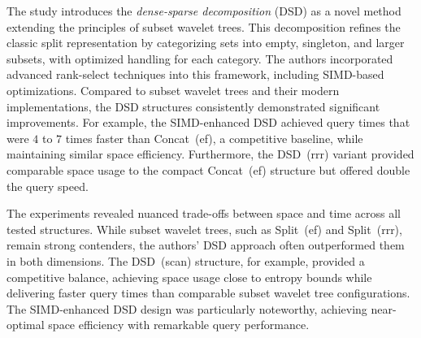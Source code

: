\noindent The study introduces the \emph{dense-sparse decomposition} (DSD) as a novel method extending the principles of subset wavelet trees. This decomposition refines the classic split representation by categorizing sets into empty, singleton, and larger subsets, with optimized handling for each category. The authors incorporated advanced rank-select techniques into this framework, including SIMD-based optimizations. Compared to subset wavelet trees and their modern implementations, the DSD structures consistently demonstrated significant improvements. For example, the SIMD-enhanced DSD achieved query times that were $4$ to $7$ times faster than Concat~(ef), a competitive baseline, while maintaining similar space efficiency. Furthermore, the DSD~(rrr) variant provided comparable space usage to the compact Concat~(ef) structure but offered double the query speed. \vspace{1em}

\noindent The experiments revealed nuanced trade-offs between space and time across all tested structures. While subset wavelet trees, such as Split~(ef) and Split~(rrr), remain strong contenders, the authors' DSD approach often outperformed them in both dimensions. The DSD~(scan) structure, for example, provided a competitive balance, achieving space usage close to entropy bounds while delivering faster query times than comparable subset wavelet tree configurations. The SIMD-enhanced DSD design was particularly noteworthy, achieving near-optimal space efficiency with remarkable query performance.
